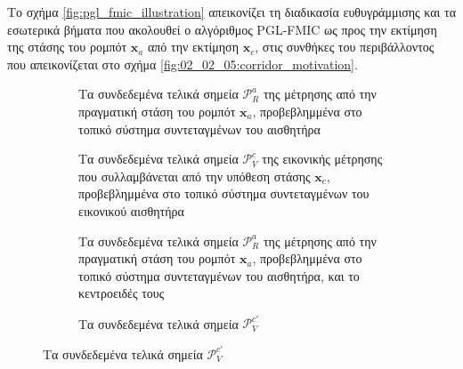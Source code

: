 Το σχήμα \ref{fig:pgl_fmic_illustration} απεικονίζει τη διαδικασία ευθυγράμμισης
και τα εσωτερικά βήματα που ακολουθεί ο αλγόριθμος PGL-FMIC ως προς την
εκτίμηση της στάσης του ρομπότ $\bm{x}_a$ από την εκτίμηση $\bm{x}_c$, στις
συνθήκες του περιβάλλοντος που απεικονίζεται στο σχήμα
\ref{fig:02_02_05:corridor_motivation}.


\begin{figure}\centering
    \begin{subfigure}[t]{0.475\linewidth} \centering
        \hspace{0.5cm}
        \vspace{1em}
        \caption{\small Τα συνδεδεμένα τελικά σημεία $\mathcal{P}_R^a$ της
                 μέτρησης από την πραγματική στάση του ρομπότ $\bm{x}_a$,
                 προβεβλημμένα στο τοπικό σύστημα συντεταγμένων του αισθητήρα}
    \end{subfigure}
    \hfill
    \begin{subfigure}[t]{0.475\linewidth} \centering
        \hspace{0.5cm}
        \vspace{1em}
        \caption{\small Τα συνδεδεμένα τελικά σημεία $\mathcal{P}_V^c$ της
                 εικονικής μέτρησης που συλλαμβάνεται από την υπόθεση στάσης
                 $\bm{x}_c$, προβεβλημμένα στο τοπικό σύστημα συντεταγμένων του
                 εικονικού αισθητήρα}
    \end{subfigure}
    \begin{subfigure}[t]{0.475\linewidth} \centering
        \hspace{0.5cm}
        \vspace{1em}
        \caption {\small Τα συνδεδεμένα τελικά σημεία $\mathcal{P}_R^a$ της
                 μέτρησης από την πραγματική στάση του ρομπότ $\bm{x}_a$,
                 προβεβλημμένα στο τοπικό σύστημα συντεταγμένων του αισθητήρα,
                 και το κεντροειδές τους}
    \end{subfigure}
    \hfill
    \begin{subfigure}[t]{0.475\linewidth} \centering
        \hspace{0.5cm}
        \vspace{1em}
         \caption{\small Τα συνδεδεμένα τελικά σημεία $\mathcal{P}_V^{c\prime}$
}
\end{subfigure}
\end{figure}
